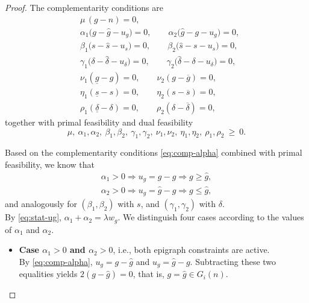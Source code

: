 \documentclass[11pt]{article}
\theoremstyle{plain}
\theoremstyle{definition}
\begin{document}
\begin{proof}
\noindent The complementarity conditions are
\begin{align}
    &\mu\,(g-n)=0,
    \label{eq:comp-mu}
    \\
    &\alpha_1\bigl(g-\widehat g-u_g\bigr)=0,
    \qquad
    \alpha_2\bigl(\widehat g-g-u_g\bigr)=0,
    \label{eq:comp-alpha}
    \\
    &\beta_1\bigl(s-\widehat s-u_s\bigr)=0,
    \qquad
    \beta_2\bigl(\widehat s-s-u_s\bigr)=0,
    \label{eq:comp-beta}
    \\
    &\gamma_1\bigl(\delta-\widehat\delta-u_\delta\bigr)=0,
    \qquad
    \gamma_2\bigl(\widehat\delta-\delta-u_\delta\bigr)=0,
    \label{eq:comp-gamma}
    \\
    &\nu_1(\underline g-g)=0,
    \qquad
    \nu_2(g-\overline g)=0,
    \label{eq:comp-nu}
    \\
    &\eta_1(\underline s-s)=0,
    \qquad
    \eta_2(s-\overline s)=0,
    \label{eq:comp-eta}
    \\
    &\rho_1(\underline\delta-\delta)=0,
    \qquad
    \rho_2(\delta-\overline\delta)=0,
    \label{eq:comp-rho}
\end{align}
together with primal feasibility and dual feasibility
\[
    \mu,\ \alpha_1,\alpha_2,\ \beta_1,\beta_2,\ \gamma_1,\gamma_2,\
    \nu_1,\nu_2,\ \eta_1,\eta_2,\ \rho_1,\rho_2\ \ge\ 0 .
\]

\noindent Based on the complementarity conditions \eqref{eq:comp-alpha} combined with primal feasibility, we know that
\begin{align}
    \label{eq:sign-info}
    \alpha_1>0 \Longrightarrow u_g=g-\widehat g \Longrightarrow g\ge\widehat g,\\
    \alpha_2>0 \Longrightarrow u_g=\widehat g-g \Longrightarrow g\le\widehat g,
\end{align}
and analogously for $(\beta_1,\beta_2)$ with $s$, and
$(\gamma_1,\gamma_2)$ with $\delta$.
\\

\noindent By \eqref{eq:stat-ug}, $\alpha_1+\alpha_2=\lambda w_g$. 
We distinguish four cases according to the values of $\alpha_1$ and $\alpha_2$.
 
\begin{itemize}
    \item \textbf{Case $\alpha_1>0$ and $\alpha_2>0$}, i.e., both epigraph constraints are active.\\
    By \eqref{eq:comp-alpha}, $u_g=g-\widehat g$ and $u_g=\widehat g-g$. 
    Subtracting these two equalities yields $2(g-\widehat g)=0$, that is, $\boxed{g=\widehat g}\in G_i(n)$.
 

\end{itemize}
\end{proof}
\end{document}
